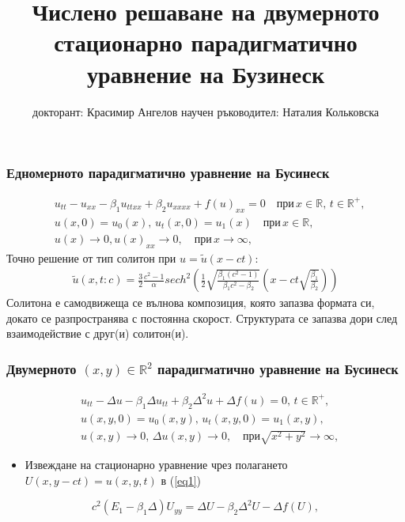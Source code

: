 \documentclass{beamer}
\title{Числено решаване на двумерното стационарно парадигматично уравнение на Бузинеск}
\author{докторант: Красимир Ангелов 
\newline \newline научен ръководител: Наталия Кольковска}
\newcommand{\RR}{\mathbb{R}}
\newcommand{\rf}[1]{(\ref{#1})}
\begin{document}
\begin{frame}
\titlepage
\end{frame}


\begin{frame}
\frametitle{ Едномерното парадигматично уравнение на Бусинеск }
\begin{align}
&u_{tt} - u_{xx} -\beta_1  u_{ttxx} +\beta_2 u_{xxxx} + f(u)_{xx}=0   \quad \text{при} \,  x \in \RR, \, t\in\RR^+,\label{eq1D}
\\ \nonumber &u(x,0)=u_0(x), \, u_t(x,0)=u_1(x)   \quad\text{при} \, x \in \RR,
\\  &u(x) \rightarrow 0,  u(x)_{xx} \rightarrow 0 ,  \quad \text{при} \, x \rightarrow \infty, \label{eq1d1}
\end{align}
Точно решение от тип солитон при $u =\tilde u(x-ct)$:
\begin{align}
\tilde u(x,t:c) = \frac{3}{2} \frac{c^2-1}{\alpha}sech^2 \left( \frac{1}{2}  \sqrt{ \frac{\beta_1 (c^2-1)}{\beta_1 c^2-\beta_2}} (x-c t \sqrt{\frac{\beta_1}{\beta_2}} ) \right)
\end{align}
Солитона е самодвижеща се вълнова композиция, която запазва формата си, докато се разпространява с постоянна скорост. Структурата се запазва дори след взаимодействие с друг(и) солитон(и).
\end{frame}

\begin{frame}
\frametitle{ Двумерното $(x,y) \in \RR^2$ парадигматично уравнение на Бусинеск }
\begin{align}
&u_{tt} - \Delta u -\beta_1  \Delta u_{tt} +\beta_2 \Delta ^2 u + \Delta f(u)=0, \, t\in\RR^+,\label{eq1}
\\ \nonumber &u(x,y,0)=u_0(x,y), \, u_t(x,y,0)=u_1(x,y)  ,
\\  &u(x,y) \rightarrow 0, \,  \Delta u(x,y) \rightarrow 0 ,  \quad \text{при} \sqrt{x^2 + y^2} \rightarrow \infty, \label{eq11}
\end{align}
\begin{itemize}
  \item Извеждане на {\color{red}стационарно} уравнение чрез полагането $U(x,y-ct)=u(x,y,t)$ в \rf{eq1}
\end{itemize}
\color{red}
\begin{equation}
c^2 (E_1-\beta_1 \Delta) U_{yy} = \Delta U -\beta_2 \Delta^2 U - \Delta f(U),
\end{equation}

\end{frame}
\end{document}

